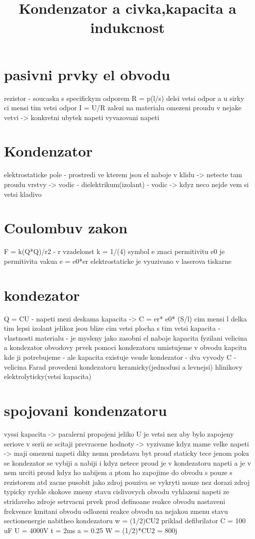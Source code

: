 \documentclass{article}
\begin{document}
\sloppy
\title{Kondenzator a civka,kapacita a indukcnost}
\section{pasivni prvky el obvodu}
rezistor - soucaska s specifickym odporem
R = p(l/s) delsi vetsi odpor a u sirky ci mensi tim vetsi odpor
I = U/R
zalezi na materialu
omezeni proudu v nejake vetvi -> konkretni ubytek napeti
vyvazovani napeti
\section{Kondenzator}
elektrostaticke pole - prostredi ve kterem jsou el naboje v klidu -> netecte tam proudu
vrstvy -> vodic - dielektrikum(izolant) - vodic -> kdyz neco nejde vem si vetsi kladivo
\section{Coulombuv zakon}
F = k(Q*Q)/r2 - r vzadelonst
k = 1/(4\pi* \e)
symbol e znaci permitivitu
e0 je permitivita vakua
e = e0*er
elektrostaticke je vyuzivano v laserova tiskarne
\section{kondezator}
Q = CU - napeti mezi deskama
kapacita -> C = er* e0* (S/l) cim mensi l delka tim lepsi izolant jelikoz
jsou blize
cim vetsi plocha s tim vetsi kapacita
- vlastnosti materialu
- je mysleny jako zasobni el naboje
kapacita fyzilani velicina a kondezator obvodovy prvek
pomoci kondezatoru umistujeme v obvodu kapcitu kde ji potrebujeme
- ale kapacita existuje vsude
kondezator - dva vyvody
C - velicina Farad
provedeni kondezatoru keramicky(jednodusi a levnejsi)
hlinikovy elektrolyticky(vetsi kapacita)
\section{spojovani kondenzatoru}
vyssi kapacita -> paralerni propojeni jeliko U je vetsi nez aby bylo zapojeny seriove
v serii se scitaji prevracene hodnoty -> vyzivame kdyz mame velke napeti -> maji omezeni napeti
diky nemu predstava byt proud staticky tece jenom poku se kondezator se vybiji a nabiji
i kdyz netece proud je v kondezatoru napeti a je v nem urciti proud
kdyz ho nabijem a ptom ho zapojime do obvodu s pouze s rezistorem atd zacne pusobit jako zdroj
pouziva se vykryti nouze nez dorazi zdroj
    typicky rychle skokove zmeny stavu cislivovych obvodu
    vyhlazeni napeti ze stridaveho zdroje
setrvacni prvek
     prod definoane reakce obvodu
     nastaveni frekvence kmitani obvodu
     odlozeni reakce obvodu na nejakou zmenu stavu
section{energie nabitheo kondezatoru}
w = (1/2)CU2
priklad defibrilator
C = 100 uF
U = 4000V
t = 2ms
a = 0.25    W = (1/2)*CU2 = 800j
\end{document}
